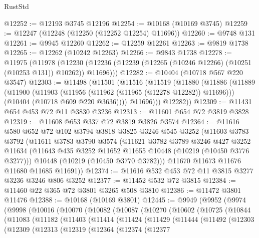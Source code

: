 \begin{lexlean}{RustStd}
\begin{coremodule}
@12252 := @12193 @3745 @12196
@12254 := @10168 (@10169 @3745)
@12259 := @12247 (@12248 (@12250 (@12252 @12254) @11696))
@12260 := @9748 @131
@12261 := @9945 @12260
@12262 := @12259 @12261
@12263 := @9819 @1738
@12265 := @12262 (@10242 @12263)
@12266 := @9843 @1738
@12278 := @11975
    (@11978
      (@12230 (@12236 (@12239 (@12265 (@10246 @12266) (@10251 (@10253 @131)) @10262)) @11696)))
@12282 := @10404 (@10718 @567 @220 @3547)
@12303 := @11498
    (@11501
      (@11516
        (@11519
          (@11880
            (@11886
              (@11889
                (@11900
                  (@11903 (@11956 (@11962 (@11965 (@12278 @12282)) @11696)))
                  (@10404 (@10718 @609 @220 @3636))))
              @11696)))
        @12282))
@12309 := @11431 @654 @453 @72 @11 @3830 @3236
@12313 := @11601 @654 @72 @3819 @3828
@12319 := @11608 @653 @337 @72 @3819 @3826 @3574
@12364 := @11616
    @580
    @652
    @72
    @102
    @3794
    @3818
    @3825
    @3246
    @545
    @3252
    (@11603
      @3783
      @3792
      (@11611
        @3783
        @3790
        @3574
        (@11621
          @3782
          @3789
          @3246
          @427
          @3252
          @11634
          (@11643 @435 @3252 @11652 @11655 @10448 (@10219 (@10450 @3776 @3277)))
          @10448
          (@10219 (@10450 @3770 @3782)))
        @11670
        @11673
        @11676
        @11680
        @11685
        @11691))
@12374 := @11616 @532 @453 @72 @11 @3815 @3277 @3236 @3246 @806 @3252
@12377 := @11452 @532 @72 @3815
@12384 := @11460 @22 @365 @72 @3801 @3265 @508 @3810
@12386 := @11472 @3801 @11476
@12388 := @10168 (@10169 @3801)
@12445 := @9949
    (@9952
      (@9974
        (@9998
          (@10016
            (@10070
              (@10082
                (@10087
                  (@10270
                    (@10602
                      (@10725
                        (@10844
                          (@11083
                            (@11182
                              (@11403
                                (@11414
                                  (@11424
                                    (@11429
                                      (@11444
                                        (@11492
                                          (@12303
                                            (@12309
                                              (@12313
                                                (@12319
                                                  (@12364
                                                    (@12374
                                                      (@12377

\end{coremodule}
\end{lexlean}
